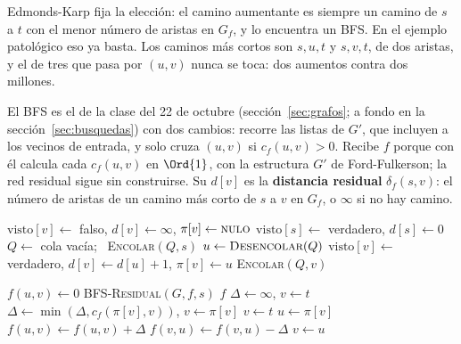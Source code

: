 \documentclass[11pt,letterpaper]{article}
\begin{document}
Edmonds-Karp fija la elección: el camino aumentante es siempre un
camino de $s$ a $t$ con el menor número de aristas en $G_f$, y lo
encuentra un BFS. En el ejemplo patológico eso ya basta. Los caminos
más cortos son $s, u, t$ y $s, v, t$, de dos aristas, y el de tres que
pasa por $(u, v)$ nunca se toca: dos aumentos contra dos millones.

El BFS es el de la clase del 22 de octubre
(sección~\ref{sec:grafos}; a fondo en la sección~\ref{sec:busquedas})
con dos cambios: recorre las listas de $G'$, que incluyen a los
vecinos de entrada, y solo cruza $(u, v)$ si $c_f(u, v) > 0$. Recibe
$f$ porque con él calcula cada $c_f(u, v)$ en $\Ord{1}$, con la
estructura $G'$ de Ford-Fulkerson; la red residual sigue sin
construirse. Su $d[v]$ es la \textbf{distancia residual}
$\delta_f(s, v)$: el número de aristas de un camino más corto de $s$ a
$v$ en $G_f$, o $\infty$ si no hay camino.

\begin{algorithm}[H]
\caption{\textsc{BFS-Residual}$(G, f, s)$}
\label{alg:flujo-bfs-residual}
\begin{algorithmic}[1]
    \State $\text{visto}[v] \gets$ falso, \quad $d[v] \gets \infty$,
           \quad $\pi[v] \gets \textsc{nulo}$
  \EndFor
  \State $\text{visto}[s] \gets$ verdadero, \quad $d[s] \gets 0$
  \State $Q \gets$ cola vacía; \ \textsc{Encolar}$(Q, s)$
    \State $u \gets \textsc{Desencolar}(Q)$
        \State $\text{visto}[v] \gets$ verdadero, \quad
               $d[v] \gets d[u] + 1$, \quad $\pi[v] \gets u$
        \State \textsc{Encolar}$(Q, v)$
      \EndIf
    \EndFor
  \EndWhile
\EndProcedure
\end{algorithmic}
\end{algorithm}

\begin{algorithm}[H]
\caption{\textsc{Edmonds-Karp}$(G, s, t)$}
\label{alg:edmonds-karp}
\begin{algorithmic}[1]
    \State $f(u, v) \gets 0$
  \EndFor
  \Loop
    \State \textsc{BFS-Residual}$(G, f, s)$
      \State \Return $f$ 
    \EndIf
    \State $\Delta \gets \infty$, \quad $v \gets t$
     
      \State $\Delta \gets \min(\Delta, c_f(\pi[v], v))$, \quad
             $v \gets \pi[v]$
    \EndWhile
    \State $v \gets t$
     
      \State $u \gets \pi[v]$
        \State $f(u, v) \gets f(u, v) + \Delta$
      \Else
        \State $f(v, u) \gets f(v, u) - \Delta$
      \EndIf
      \State $v \gets u$
    \EndWhile
  \EndLoop
\EndProcedure
\end{algorithmic}
\end{algorithm}
\end{document}
